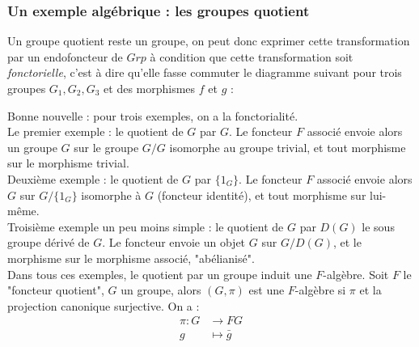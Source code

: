 \documentclass{article}
\begin{document}
\subsubsection{Un exemple algébrique : les groupes quotient}

Un groupe quotient reste un groupe, on peut donc exprimer cette transformation par un endofoncteur de $Grp$ à condition que cette transformation soit \textit{fonctorielle}, c'est à dire qu'elle fasse commuter le diagramme suivant pour trois groupes $G_1,G_2,G_3$ et des morphismes $f$ et $g$ : 

\begin{center}
\end{center}

Bonne nouvelle : pour trois exemples, on a la fonctorialité. \\ 
Le premier exemple : le quotient de $G$ par $G$. Le foncteur $F$ associé envoie alors un groupe $G$ sur le groupe $G/G$ isomorphe au groupe trivial, et tout morphisme sur le morphisme trivial. \\ 
Deuxième exemple : le quotient de $G$ par $\{1_G\}$. Le foncteur $F$ associé envoie alors $G$ sur $G/\{ 1_G\}$ isomorphe à $G$ (foncteur identité), et tout morphisme sur lui-même. \\ 
Troisième exemple un peu moins simple : le quotient de $G$ par $D(G)$ le sous groupe dérivé de $G$. Le foncteur envoie un objet $G$ sur $G/D(G)$, et le morphisme sur le morphisme associé, "abélianisé". \\ 
Dans tous ces exemples, le quotient par un groupe induit une $F$-algèbre. Soit $F$ le "foncteur quotient", $G$ un groupe, alors $(G, \pi)$ est une $F$-algèbre  si $\pi$ et la projection canonique surjective. On a :  
\begin{align*}
    \pi : G & \rightarrow  FG\\
          g & \mapsto \bar{g}
\end{align*}
\end{document}
